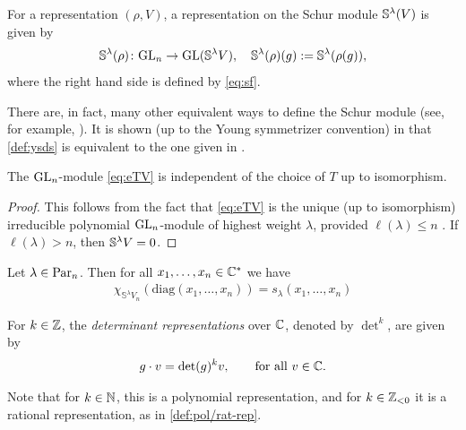 \documentclass[11pt]{amsart}
\begin{document}
\begin{defin}
    For a representation $(\rho, V)$, a representation on the Schur module $\mathbb{S}^\lambda(V)$ is given by 
    \begin{equation}
        \mathbb{S}^\lambda(\rho) \colon \mathrm{GL}_n \rightarrow \mathrm{GL} (\mathbb{S^\lambda }V), \quad \mathbb{S}^\lambda(\rho)(g) := \mathbb{S}^\lambda(\rho(g)),
    \end{equation} where the right hand side is defined by \cref{eq:sf}.
\end{defin}

\begin{rem}
    There are, in fact, many other equivalent ways to define the Schur module (see, for example, \cite[\S 8]{Ful97}). It is shown (up to the Young symmetrizer convention) in \cite[Lem.~2.2.13]{Wey03} that \cref{def:ysds} is equivalent to the one given in \cite[\S 8]{Ful97}.
\end{rem}

\begin{prop}
    The $\mathrm{GL}_n$-module \cref{eq:eTV} is independent of the choice of $T$ up to isomorphism.
    \end{prop}
    \begin{proof}This follows from the fact that \cref{eq:eTV} is the unique (up to isomorphism) irreducible polynomial $\mathrm{GL}_n$-module of highest weight $\lambda$, provided $\ell(\lambda) \leq n$ {\cite[\S 8.2 Thm. 2]{Ful97}}.  If $\ell(\lambda) > n$, then $\mathbb{S}^\lambda V = 0$. 
\end{proof}

\begin{theo}\label{prop:char-sc}
    Let $\lambda \in \mathrm{Par}_n$. Then for all \(x_1,\dots,x_n \in \mathbb{C}^\ast\) we have 
    \begin{align}
        \chi_{\mathbb{S}^\lambda V_n}(\mathrm{diag}(x_1,\dots,x_n)) = s_\lambda(x_1,\dots,x_n) \label{eq:char-sc}
    \end{align}
\end{theo}

\begin{defin}
    For \(k \in \mathbb{Z}\), the \emph{determinant representations} over \(\mathbb{C}\), denoted by \(\det^k\), are given by
\begin{align}
    g \cdot v = \det(g)^k v \label{eq:det-rep}, \qquad \text{for all } v \in \mathbb{C}.
 \end{align}
\end{defin}
 Note that for \(k \in \mathbb{N}\), this is a polynomial representation, and for \(k \in \mathbb{Z}_{<0}\) 
it is a rational representation, as in \cref{def:pol/rat-rep}.
\end{document}
